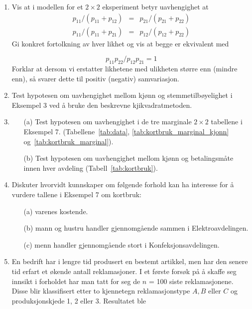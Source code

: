 \begin{enumerate}
\item
Vis at i modellen for et $2\times 2$ eksperiment betyr uavhengighet at
\begin{eqnarray*}
   p_{11}/(p_{11}+p_{12})&=&p_{21}/(p_{21}+p_{22}) \\
   p_{11}/(p_{11}+p_{21})&=&p_{12}/(p_{12}+p_{22})   
\end{eqnarray*}
Gi konkret fortolkning av hver likhet og vis at begge er ekvivalent med 

\[ p_{11}p_{22}/p_{12}p_{21}=1  \]
Forklar at dersom vi erstatter likhetene med ulikheten større enn
(mindre enn), så svarer dette til positiv (negativ) samvariasjon.

\item
Test hypotesen om uavhengighet mellom kjønn og stemmetilbøyelighet
i Eksempel 3 ved å bruke den beskrevne kjikvadratmetoden.

\item 
\begin{itemize}
\item[(a)] Test hypotesen om uavhengighet i de tre marginale $2\times 2$
tabellene i Eksempel 7.  (Tabellene~\ref{tab:data}, 
\ref{tab:kortbruk_marginal_kjonn} og~\ref{tab:kortbruk_marginal}).
\item[(b)] Test hypotesen om uavhengighet mellom kjønn og 
betalingsmåte innen hver avdeling (Tabell~\ref{tab:kortbruk}).
\end{itemize}

\item
Diskuter hvorvidt kunnskaper om følgende forhold kan ha interesse for
å vurdere tallene i Eksempel 7 om kortbruk:
\begin{itemize}
\item[(a)] varenes kostende.
\item[(b)] mann og hustru handler gjennomgående sammen i 
Elektroavdelingen.
\item[(c)] menn handler gjennomgående stort i Konfeksjonsavdelingen.
\end{itemize}

\item
En bedrift har i lengre tid produsert en bestemt artikkel, men har den senere
tid erfart et økende antall reklamasjoner.  I et første forsøk
på å skaffe seg innsikt i forholdet har man tatt for seg de
$n$ = 100 siste reklamasjonene.  Disse blir klassifisert etter to 
kjennetegn reklamasjonstype $A, B$ eller $C$ og produksjonskjede 1, 2
eller 3.  Resultatet ble


\end{enumerate}
